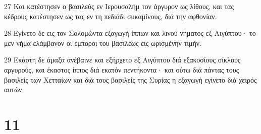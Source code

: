 \par 27 Και κατέστησεν ο βασιλεύς εν Ιερουσαλήμ τον άργυρον ως λίθους, και τας κέδρους κατέστησεν ως τας εν τη πεδιάδι συκαμίνους, διά την αφθονίαν.
\par 28 Εγίνετο δε εις τον Σολομώντα εξαγωγή ίππων και λινού νήματος εξ Αιγύπτου· το μεν νήμα ελάμβανον οι έμποροι του βασιλέως εις ωρισμένην τιμήν.
\par 29 Εκάστη δε άμαξα ανέβαινε και εξήρχετο εξ Αιγύπτου διά εξακοσίους σίκλους αργυρούς, και έκαστος ίππος διά εκατόν πεντήκοντα· και ούτω διά πάντας τους βασιλείς των Χετταίων και διά τους βασιλείς της Συρίας η εξαγωγή εγίνετο διά χειρός αυτών.

\chapter{11}

